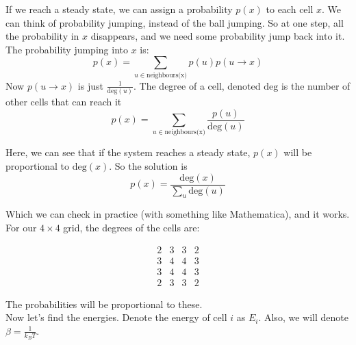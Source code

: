 \newpage
\begin{solution}
If we reach a steady state, we can assign a probability $p(x)$ to each cell $x$.
We can think of probability jumping, instead of the ball jumping.
So at one step, all the probability in $x$ disappears, and we need some probability jump back into it.\\

The probability jumping into $x$ is:
\begin{equation*}
    p(x) = \sum_{u \in \text{neighbours(x)}} p(u)p(u \rightarrow x)   
\end{equation*}
Now $p(u\rightarrow x)$ is just $\frac{1}{\text{deg}(u)}$. The degree of a cell, denoted $\text{deg}$ is the number
of other cells that can reach it
\begin{equation*}
    p(x) = \sum_{u \in \text{neighbours(x)}} \frac{p(u)}{\text{deg}(u)}  
\end{equation*}

Here, we can see that if the system reaches a steady state, $p(x)$ will be proportional to $\text{deg}(x)$.
So the solution is 
\begin{equation*}
    p(x) = \frac{\text{deg}(x)}{\sum_u \text{deg}(u)}
\end{equation*}

Which we can check in practice (with something like Mathematica), and it works.
\\

For our $4 \times 4$ grid, the degrees of the cells are:

\[
\begin{matrix}
2 & 3 & 3 & 2 \\
3 & 4 & 4 & 3 \\
3 & 4 & 4 & 3 \\
2 & 3 & 3 & 2
\end{matrix}
\]

The probabilities will be proportional to these.\\

Now let's find the energies. Denote the energy of cell $i$ as $E_i$. Also, we will denote $\beta = \frac{1}{k_B T}$. 


\end{solution}
